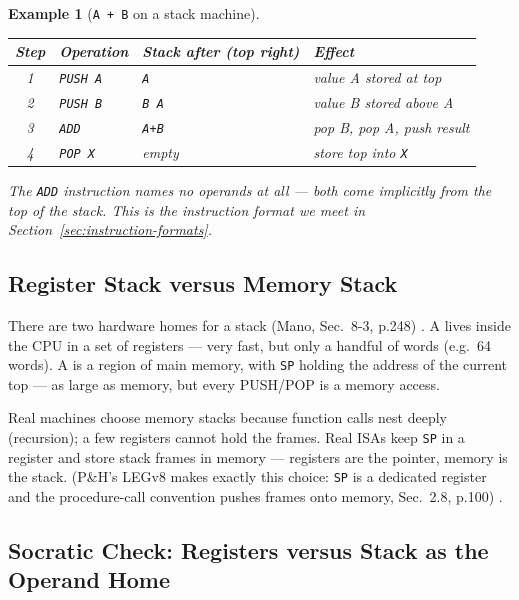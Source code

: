 \documentclass[11pt]{article}
\newtheorem{example}{Example}[section]
\begin{document}
\begin{example}[\texttt{A + B} on a stack machine]
\begin{center}
\small
\begin{tabular}{@{}clp{4.2cm}p{4.2cm}@{}}
\toprule
\textbf{Step} & \textbf{Operation} & \textbf{Stack after (top right)} & \textbf{Effect} \\
\midrule
1 & \texttt{PUSH A} & \texttt{A} & value A stored at top \\
2 & \texttt{PUSH B} & \texttt{B A} & value B stored above A \\
3 & \texttt{ADD}    & \texttt{A+B} & pop B, pop A, push result \\
4 & \texttt{POP X}  & \emph{empty} & store top into \texttt{X} \\
\bottomrule
\end{tabular}
\end{center}
The \texttt{ADD} instruction names \emph{no operands at all} --- both come implicitly from the top of the stack. This is the  instruction format we meet in Section~\ref{sec:instruction-formats}.
\end{example}

\subsection{Register Stack versus Memory Stack}

There are two hardware homes for a stack (Mano, Sec.~8-3, p.248) \cite{Mano1993_computer_system_architecture}. A  lives inside the CPU in a set of registers --- very fast, but only a handful of words (e.g.\ 64 words). A  is a region of main memory, with \texttt{SP} holding the address of the current top --- as large as memory, but every PUSH/POP is a memory access.

Real machines choose memory stacks because function calls nest deeply (recursion); a few registers cannot hold the frames. Real ISAs keep \texttt{SP} in a register and store stack frames in memory --- registers are the pointer, memory is the stack. (P\&H's LEGv8 makes exactly this choice: \texttt{SP} is a dedicated register and the procedure-call convention pushes frames onto memory, Sec.~2.8, p.100) \cite{PattersonHennessy2017_computer_organization_design}.

\subsection{Socratic Check: Registers versus Stack as the Operand Home}
\end{document}
